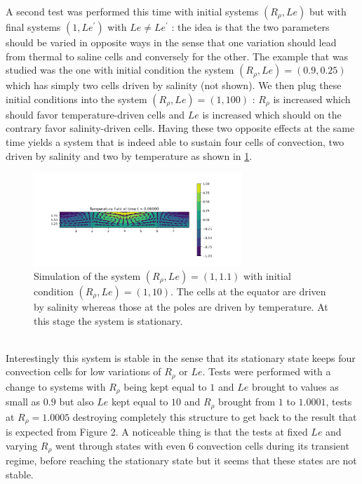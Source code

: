 \documentclass{article}
\begin{document}
\par
A second test was performed this time with initial systems $(R_{\rho},Le)$ but with final systems $(1,Le^{\prime})$ with $Le \neq Le^{\prime}$ : the idea is that the two parameters should be varied in opposite ways in the sense that one variation should lead from thermal to saline cells and conversely for the other. The example that was studied was the one with initial condition the system $(R_{\rho},Le) = (0.9,0.25)$ which has simply two cells driven by salinity (not shown). We then plug these initial conditions into the system $(R_{\rho},Le) = (1,100)$ : $R_{\rho}$ is increased which should favor temperature-driven cells and $Le$ is increased which should on the contrary favor salinity-driven cells. Having these two opposite effects at the same time yields a system that is indeed able to sustain four cells of convection, two driven by salinity and two by temperature as shown in \cref{fig:four_cells}.
\\
\begin{figure}[ht]
  \centering
  \includegraphics[width=0.7\textwidth]{images/last_subsection/four_cells.png}
  \caption{Simulation of the system $(R_{\rho},Le) = (1,1.1)$ with initial condition $(R_{\rho},Le) = (1,10)$. The cells at the equator are driven by salinity whereas those at the poles are driven by temperature. At this stage the system is stationary.}
  \label{fig:four_cells}
\end{figure}
\\
Interestingly this system is stable in the sense that its stationary state keeps four convection cells for low variations of $R_{\rho}$ or $Le$. Tests were performed with a change to systems with $R_{\rho}$ being kept equal to $1$ and $Le$ brought to values as small as $0.9$ but also $Le$ kept equal to $10$ and $R_{\rho}$ brought from $1$ to $1.0001$, tests at $R_{\rho} = 1.0005$ destroying completely this structure to get back to the result that is expected from Figure 2. A noticeable thing is that the tests at fixed $Le$ and varying $R_{\rho}$ went through states with even 6 convection cells during its transient regime, before reaching the stationary state but it seems that these states are not stable.
\end{document}
